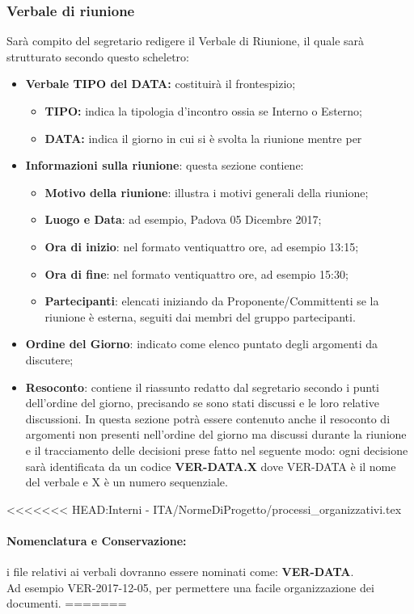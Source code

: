 \documentclass[NormeDiProgetto.tex]{subfiles}
\begin{document}
	\subsubsection{Verbale di riunione}
	Sarà compito del segretario redigere il Verbale di Riunione, il quale sarà strutturato secondo questo scheletro:
	\begin{itemize}
		\item \textbf{Verbale TIPO del DATA:} costituirà il frontespizio;
		\begin{itemize}
			\item \textbf{TIPO:} indica la tipologia d'incontro ossia se Interno o Esterno;
			\item \textbf{DATA:} indica il giorno in cui si è svolta la riunione mentre per 
		\end{itemize}
		\item \textbf{Informazioni sulla riunione}: questa sezione contiene:
		\begin{itemize}
			\item \textbf{Motivo della riunione}: illustra i motivi generali della riunione; 
			\item \textbf{Luogo e Data}: ad esempio, Padova 05 Dicembre 2017;
			\item \textbf{Ora di inizio}: nel formato ventiquattro ore, ad esempio 13:15;
			\item \textbf{Ora di fine}: nel formato ventiquattro ore, ad esempio 15:30;
			\item \textbf{Partecipanti}: elencati iniziando da Proponente/Committenti se la riunione è esterna, seguiti dai membri del gruppo partecipanti.			\end{itemize}
			\item \textbf{Ordine del Giorno}: indicato come elenco puntato degli argomenti da discutere;
			\item \textbf{Resoconto}: contiene il riassunto redatto dal segretario secondo i punti dell'ordine del giorno, precisando se sono stati discussi e le loro relative discussioni. In questa sezione potrà essere contenuto anche il resoconto di argomenti non presenti nell'ordine del giorno ma discussi durante la riunione e il tracciamento delle decisioni prese fatto nel seguente modo: ogni decisione sarà identificata da un codice \textbf{VER-DATA.X} dove VER-DATA è il nome del verbale e X è un numero sequenziale.
	\end{itemize}
<<<<<<< HEAD:Interni - ITA/NormeDiProgetto/processi_organizzativi.tex
	\paragraph{Nomenclatura e Conservazione:} i file relativi ai verbali dovranno essere nominati come: \textbf{VER-DATA}.\\
	Ad esempio VER-2017-12-05, per permettere una facile organizzazione dei documenti.
=======
\end{document}
